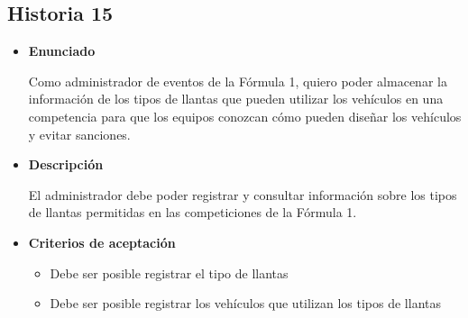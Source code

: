 \documentclass{article}
\begin{document}
	\subsection{Historia 15}
	\begin{itemize}
		
		\item \large{\textbf{Enunciado}}
		\begin{description}
Como administrador de eventos de la Fórmula 1, quiero poder almacenar la información de los tipos de llantas que pueden utilizar los vehículos en una competencia para que los equipos conozcan cómo pueden diseñar los vehículos y evitar sanciones.

		\end{description}
		
		\item \large{\textbf{Descripción}}
		\begin{description}
El administrador debe poder registrar y consultar información sobre los tipos de llantas permitidas en las competiciones de la Fórmula 1.

		\end{description}
		
		\item \large{\textbf{Criterios de aceptación}}
		\begin{itemize}
			\item Debe ser posible registrar el tipo de llantas
			\item Debe ser posible registrar los vehículos que utilizan los tipos de llantas
			
		\end{itemize}
		
	\end{itemize}
	
\end{document}
